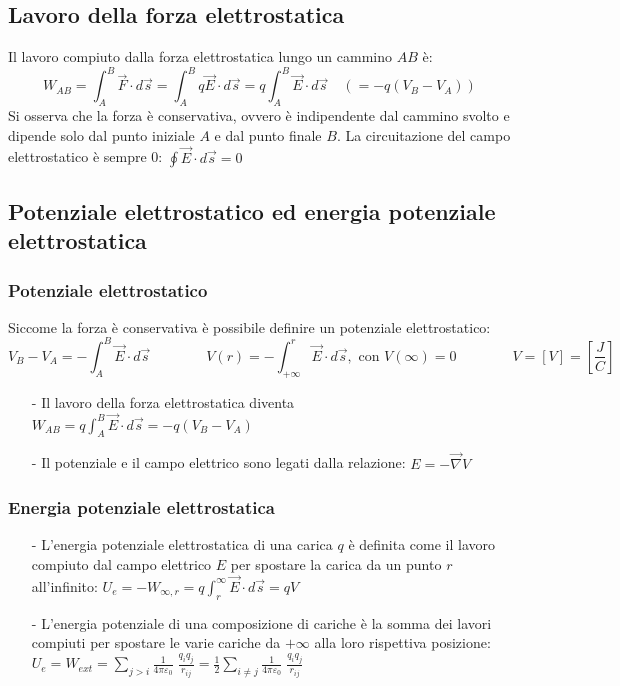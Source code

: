 \documentclass[a4paper]{article}
\newcommand\nab{\vec{\nabla}} %
\begin{document}
\newpage

\subsection{Lavoro della forza elettrostatica}
Il lavoro compiuto dalla forza elettrostatica lungo un cammino \(AB\) è:
\[W_{AB} = \int_A^B \vec{F} \cdot d\vec{s} = \int_A^B q \vec{E} \cdot d\vec{s} = q \int_A^B \vec{E} \cdot d\vec{s} \quad (= - q (V_B - V_A))\]
Si osserva che la forza è conservativa, ovvero è indipendente dal cammino svolto e dipende solo dal punto iniziale \(A\) e dal
punto finale \(B\). La circuitazione del campo elettrostatico è sempre 0: \(\displaystyle \oint \vec{E} \cdot d\vec{s} = 0\)

\subsection{Potenziale elettrostatico ed energia potenziale elettrostatica}
\subsubsection*{Potenziale elettrostatico}
Siccome la forza è conservativa è possibile definire un potenziale elettrostatico:
\[V_B - V_A = - \int_A^B \vec{E} \cdot d\vec{s} \qquad \qquad V(r) = -\int_{+\infty}^r \vec{E} \cdot d\vec{s}, \text{ con } V(\infty) = 0 \qquad \qquad V = \left[V\right] = \left[ \frac{J}{C} \right]\]

\begin{itemize}
	\item[-] Il lavoro della forza elettrostatica diventa \(\displaystyle W_{AB} = q \int_A^B \vec{E} \cdot d\vec{s} = - q (V_B - V_A)\)
	\item[-] Il potenziale e il campo elettrico sono legati dalla relazione: \(\displaystyle E = - \nab V\)
\end{itemize}

\subsubsection*{Energia potenziale elettrostatica}
\begin{itemize}
	\item[-] L'energia potenziale elettrostatica di una carica \(q\) è definita come il lavoro compiuto dal campo elettrico \(E\) per spostare
	la carica da un punto \(r\) all'infinito: \(\displaystyle U_e = - W_{\infty,r} =  q \int_r^{\infty} \vec{E} \cdot d\vec{s} = qV\)
	
	\item[-] L'energia potenziale di una composizione di cariche è la somma dei lavori compiuti per spostare le varie cariche da \(+\infty\)
	alla loro rispettiva posizione: \(\displaystyle U_e = W_{ext} = \sum_{j>i} \frac{1}{4 \pi \varepsilon_0} \; \frac{q_i q_j}{r_{ij}} = \frac{1}{2} \sum_{i \neq j} \frac{1}{4 \pi \varepsilon_0} \; \frac{q_i q_j}{r_{ij}}\)
\end{itemize}
\end{document}
